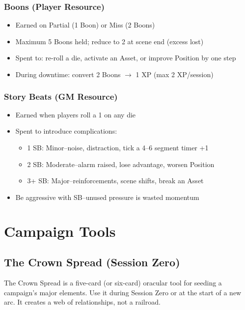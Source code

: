 \subsubsection{Boons (Player Resource)}
\begin{itemize}
  \item Earned on Partial (1 Boon) or Miss (2 Boons)
  \item Maximum 5 Boons held; reduce to 2 at scene end (excess lost)
  \item Spent to: re-roll a die, activate an Asset, or improve Position by one step
  \item During downtime: convert 2 Boons $\rightarrow$ 1 XP (max 2 XP/session)
\end{itemize}

\subsubsection{Story Beats (GM Resource)}
\begin{itemize}
  \item Earned when players roll a 1 on any die
  \item Spent to introduce complications:
  \begin{itemize}
    \item 1 SB: Minor--noise, distraction, tick a 4--6 segment timer +1
    \item 2 SB: Moderate--alarm raised, lose advantage, worsen Position
    \item 3+ SB: Major--reinforcements, scene shifts, break an Asset
  \end{itemize}
  \item Be aggressive with SB--unused pressure is wasted momentum
\end{itemize}

\section{Campaign Tools}

\subsection{The Crown Spread (Session Zero)}

The Crown Spread is a five-card (or six-card) oracular tool for seeding a campaign's major elements. Use it during Session Zero or at the start of a new arc. It creates a web of relationships, not a railroad.

